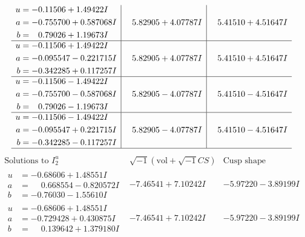 \documentclass[1p]{elsarticle_modified}
\theoremstyle{definition}
\newcommand{\I}{\sqrt{-1}}
\begin{document}
$$\begin{array}{c|c|c}
\begin{aligned}
u &= -0.11506 + 1.49422 I \\
a &= -0.755700 + 0.587068 I \\
b &= \phantom{-}0.79026 + 1.19673 I\end{aligned}
 & \phantom{-}5.82905 + 4.07787 I & \phantom{-}5.41510 + 4.51647 I \\ \hline\begin{aligned}
u &= -0.11506 + 1.49422 I \\
a &= -0.095547 - 0.221715 I \\
b &= -0.342285 + 0.117257 I\end{aligned}
 & \phantom{-}5.82905 + 4.07787 I & \phantom{-}5.41510 + 4.51647 I \\ \hline\begin{aligned}
u &= -0.11506 - 1.49422 I \\
a &= -0.755700 - 0.587068 I \\
b &= \phantom{-}0.79026 - 1.19673 I\end{aligned}
 & \phantom{-}5.82905 - 4.07787 I & \phantom{-}5.41510 - 4.51647 I \\ \hline\begin{aligned}
u &= -0.11506 - 1.49422 I \\
a &= -0.095547 + 0.221715 I \\
b &= -0.342285 - 0.117257 I\end{aligned}
 & \phantom{-}5.82905 - 4.07787 I & \phantom{-}5.41510 - 4.51647 I\\
 \hline 
 \end{array}$$\newpage$$\begin{array}{c|c|c}  
\text{Solutions to }I^u_{2}& \I (\text{vol} + \sqrt{-1}CS) & \text{Cusp shape}\\
 \hline 
\begin{aligned}
u &= -0.68606 + 1.48551 I \\
a &= \phantom{-}0.668554 - 0.820572 I \\
b &= -0.76030 - 1.55610 I\end{aligned}
 & -7.46541 + 7.10242 I & -5.97220 - 3.89199 I \\ \hline\begin{aligned}
u &= -0.68606 + 1.48551 I \\
a &= -0.729428 + 0.430875 I \\
b &= \phantom{-}0.139642 + 1.379180 I\end{aligned}
 & -7.46541 + 7.10242 I & -5.97220 - 3.89199 I \\ \hline\begin{aligned}

\end{aligned}
\end{array}$$
\end{document}
